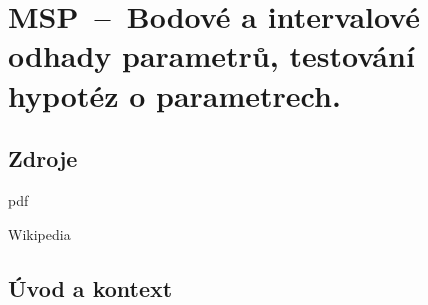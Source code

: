 

\graphicspath{{msp/odhady_parametru/figures}}


\chapter{MSP~--~Bodové a intervalové odhady parametrů, testování hypotéz o parametrech.}


\section{Zdroje}

\begin{compactitem}
    \item {}pdf
    \item {}
    \item Wikipedia
\end{compactitem}


\section{Úvod a kontext}

